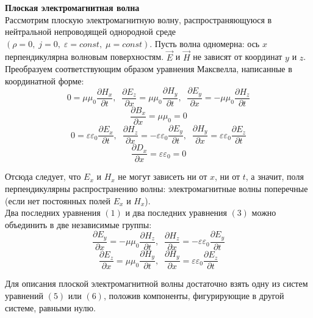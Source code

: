 \documentclass{article}
\begin{document}
	
	\textbf{Плоская электромагнитная волна}\\

	Рассмотрим плоскую электромагнитную волну, распространяющуюся в нейтральной непроводящей однородной среде $(\rho = 0,\; j = 0,\; \varepsilon = const,\; \mu = const)$. Пусть волна одномерна: ось $x$ перпендикулярна волновым поверхностям. $\vec E$ и $\vec H$ не зависят от координат $y$ и $z$. Преобразуем соответствующим образом уравнения Максвелла, написанные в координатной форме:
	\begin{equation}
		0 = \mu\mu_0\frac{\partial H_x}{\partial t},\;\;\frac{\partial E_z}{\partial x}=\mu\mu_0\frac{\partial H_y}{\partial t},\;\;\frac{\partial E_y}{\partial x}=-\mu\mu_0\frac{\partial H_z}{\partial t}
	\end{equation}
	\begin{equation}
		\frac{\partial B_x}{\partial x} = \mu\mu_0 = 0
	\end{equation}
	\begin{equation}
		0 = \varepsilon\varepsilon_0\frac{\partial E_x}{\partial t},\;\;\frac{\partial H_z}{\partial x}=-\varepsilon\varepsilon_0\frac{\partial E_y}{\partial t},\;\;\frac{\partial H_y}{\partial x}=\varepsilon\varepsilon_0\frac{\partial E_z}{\partial t}		
	\end{equation}
	\begin{equation}
		\frac{\partial D_x}{\partial x} = \varepsilon\varepsilon_0 = 0		
	\end{equation}

	Отсюда следует, что $E_x$ и $H_x$ не могут зависеть ни от $x$, ни от $t$, а значит, поля перпендикулярны распространению волны: электромагнитные волны поперечные (если нет постоянных полей $E_x$ и $H_x$).\\

	Два последних уравнения $(1)$ и два последних уравнения $(3)$ можно объединить в две независимые группы:
	\begin{equation}
		\frac{\partial E_y}{\partial x}=-\mu\mu_0\frac{\partial H_z}{\partial t},\;\;\frac{\partial H_z}{\partial x}=-\varepsilon\varepsilon_0\frac{\partial E_y}{\partial t}
	\end{equation}
	\begin{equation}
		\frac{\partial E_z}{\partial x}=\mu\mu_0\frac{\partial H_y}{\partial t},\;\;\frac{\partial H_y}{\partial x}=\varepsilon\varepsilon_0\frac{\partial E_z}{\partial t}
	\end{equation}

	Для описания плоской электромагнитной волны достаточно взять одну из систем уравнений $(5)$ или $(6)$, положив компоненты, фигурирующие в другой системе, равными нулю.\\
\end{document}
